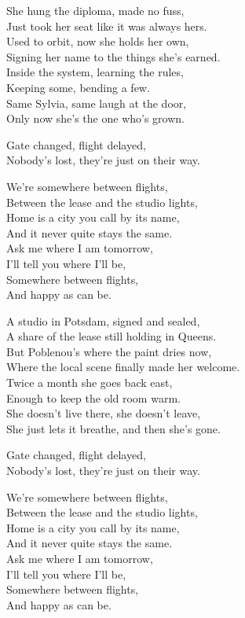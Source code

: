 \begin{lyrics}
She hung the diploma, made no fuss,\\
Just took her seat like it was always hers.\\
Used to orbit, now she holds her own,\\
Signing her name to the things she's earned.\\
Inside the system, learning the rules,\\
Keeping some, bending a few.\\
Same Sylvia, same laugh at the door,\\
Only now she's the one who's grown.

Gate changed, flight delayed,\\
Nobody's lost, they're just on their way.

We're somewhere between flights,\\
Between the lease and the studio lights,\\
Home is a city you call by its name,\\
And it never quite stays the same.\\
Ask me where I am tomorrow,\\
I'll tell you where I'll be,\\
Somewhere between flights,\\
And happy as can be.

A studio in Potsdam, signed and sealed,\\
A share of the lease still holding in Queens.\\
But Poblenou's where the paint dries now,\\
Where the local scene finally made her welcome.\\
Twice a month she goes back east,\\
Enough to keep the old room warm.\\
She doesn't live there, she doesn't leave,\\
She just lets it breathe, and then she's gone.

Gate changed, flight delayed,\\
Nobody's lost, they're just on their way.

We're somewhere between flights,\\
Between the lease and the studio lights,\\
Home is a city you call by its name,\\
And it never quite stays the same.\\
Ask me where I am tomorrow,\\
I'll tell you where I'll be,\\
Somewhere between flights,\\
And happy as can be.


\end{lyrics}
